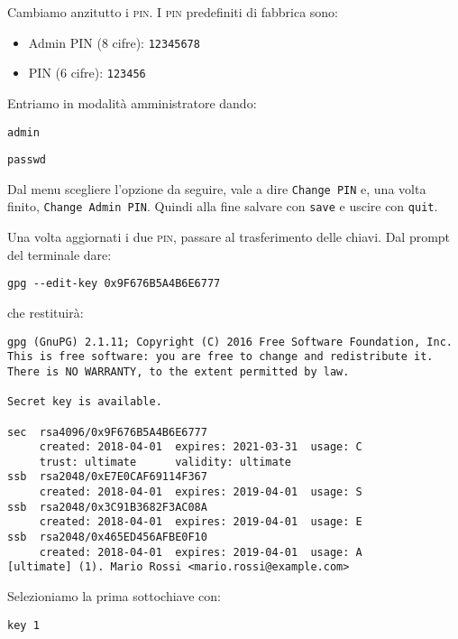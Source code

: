 \documentclass[a4paper,10pt]{article}
\begin{document}
Cambiamo anzitutto i \textsc{pin}. I \textsc{pin} predefiniti di fabbrica sono:

\begin{itemize}
   \item Admin PIN (8 cifre): \texttt{12345678}
   \item PIN (6 cifre): \texttt{123456}
\end{itemize}

Entriamo in modalità amministratore dando:

\begin{lstlisting}
admin
\end{lstlisting}

\begin{lstlisting}
passwd
\end{lstlisting}

Dal menu scegliere l'opzione da seguire, vale a dire \texttt{Change PIN} e, una volta finito, \texttt{Change Admin PIN}. Quindi alla fine salvare con \texttt{save} e uscire con \texttt{quit}.

Una volta aggiornati i due \textsc{pin}, passare al trasferimento delle chiavi. Dal prompt del terminale dare:

\begin{lstlisting}
gpg --edit-key 0x9F676B5A4B6E6777
\end{lstlisting}

che restituirà:

\begin{lstlisting}
gpg (GnuPG) 2.1.11; Copyright (C) 2016 Free Software Foundation, Inc.
This is free software: you are free to change and redistribute it.
There is NO WARRANTY, to the extent permitted by law.

Secret key is available.

sec  rsa4096/0x9F676B5A4B6E6777
     created: 2018-04-01  expires: 2021-03-31  usage: C
     trust: ultimate      validity: ultimate
ssb  rsa2048/0xE7E0CAF69114F367
     created: 2018-04-01  expires: 2019-04-01  usage: S
ssb  rsa2048/0x3C91B3682F3AC08A
     created: 2018-04-01  expires: 2019-04-01  usage: E
ssb  rsa2048/0x465ED456AFBE0F10
     created: 2018-04-01  expires: 2019-04-01  usage: A
[ultimate] (1). Mario Rossi <mario.rossi@example.com>
\end{lstlisting}

Selezioniamo la prima sottochiave con:

\begin{lstlisting}
key 1
\end{lstlisting}
\end{document}
